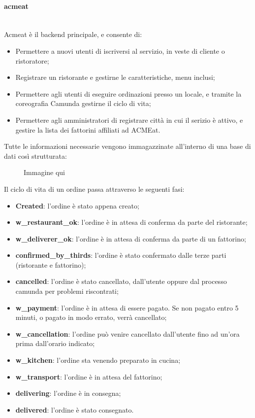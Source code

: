 \documentclass[11pt]{article} %
\begin{document}
\paragraph{acmeat}\mbox{}\\
Acmeat è il backend principale, e consente di:
\begin{itemize}
\item Permettere a nuovi utenti di iscriversi al servizio, in veste di cliente o ristoratore;
\item Registrare un ristorante e gestirne le caratteristiche, menu inclusi;
\item Permettere agli utenti di eseguire ordinazioni presso un locale, e tramite la coreografia Camunda gestirne il ciclo di vita;
\item Permettere agli amministratori di registrare città in cui il serizio è attivo, e gestire la lista dei fattorini affiliati ad ACMEat.
\end{itemize}
Tutte le informazioni necessarie vengono immagazzinate all'interno di una base di dati così strutturata:
\begin{figure}
Immagine qui
\end{figure}
Il ciclo di vita di un ordine passa attraverso le seguenti fasi:
\begin{itemize}
\item \textbf{Created}: l'ordine è stato appena creato;
\item \textbf{w\_restaurant\_ok}: l'ordine è in attesa di conferma da parte del ristorante;
\item \textbf{w\_deliverer\_ok}: l'ordine è in attesa di conferma da parte di un fattorino;
\item \textbf{confirmed\_by\_thirds}: l'ordine è stato confermato dalle terze parti (ristorante e fattorino);
\item \textbf{cancelled}: l'ordine è stato cancellato, dall'utente oppure dal processo camunda per problemi riscontrati;
\item \textbf{w\_payment}: l'ordine è in attesa di essere pagato. Se non pagato entro 5 minuti, o pagato in modo errato, verrà cancellato;
\item \textbf{w\_cancellation}: l'ordine può venire cancellato dall'utente fino ad un'ora prima dall'orario indicato;
\item \textbf{w\_kitchen}: l'ordine sta venendo preparato in cucina;
\item \textbf{w\_transport}: l'ordine è in attesa del fattorino;
\item \textbf{delivering}: l'ordine è in consegna;
\item \textbf{delivered}: l'ordine è stato consegnato.
\end{itemize}
\end{document}
